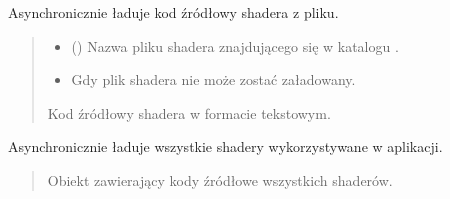 \documentclass[a4paper,10pt,openany,english]{sphinxmanual}
\begin{document}
\begin{fulllineitems}
\label{\detokenize{js/js-functions:loadShaderSource}}
\pysigstartsignatures
\pysiglinewithargsret
{}
{}
{}
\pysigstopsignatures
\sphinxAtStartPar
Asynchronicznie ładuje kod źródłowy shadera z pliku.
\begin{quote}\begin{description}
\begin{itemize}
\item {} 
\sphinxAtStartPar
{} () \textendash{} Nazwa pliku shadera znajdującego się w katalogu .

\end{itemize}

\sphinxAtStartPar
{} \textendash{} \begin{itemize}
\item {} 
\sphinxAtStartPar
Gdy plik shadera nie może zostać załadowany.

\end{itemize}


\sphinxAtStartPar
{} \textendash{} \sphinxhyphen{} Kod źródłowy shadera w formacie tekstowym.

\end{description}\end{quote}

\end{fulllineitems}


\begin{fulllineitems}
\label{\detokenize{js/js-functions:init}}
\pysigstartsignatures
\pysiglinewithargsret
{}
{}
{}
\pysigstopsignatures
\sphinxAtStartPar
Asynchronicznie ładuje wszystkie shadery wykorzystywane w aplikacji.
\begin{quote}\begin{description}
\sphinxAtStartPar
{} \textendash{} \sphinxhyphen{} Obiekt zawierający kody źródłowe wszystkich shaderów.

\end{description}\end{quote}

\end{fulllineitems}
\end{document}
